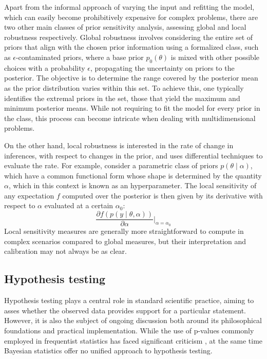 Apart from the informal approach of varying the input and refitting the model, which can easily become prohibitively expensive for complex problems, there are two other main classes of prior sensitivity analysis, assessing global and local robustness respectively. 
Global robustness involves considering the entire set of priors that align with the chosen prior information using a formalized class, such as $\epsilon$-contaminated priors, where a base prior $p_0(\theta)$ is mixed with other possible choices with a probability $\epsilon$, propagating the uncertainty on priors to the posterior. The objective is to determine the range covered by the posterior mean as the prior distribution varies within this set. To achieve this, one typically identifies the extremal priors in the set, those that yield the maximum and minimum posterior means. While not requiring to fit the model for every prior in the class, this process can become intricate when dealing with multidimensional problems.

On the other hand, local robustness is interested in the rate of change in inferences, with respect to changes in the prior, and uses differential techniques to evaluate the rate. 
For example, consider a parametric class of priors $p(\theta\mid\alpha)$, which have a common functional form whose shape is determined by the quantity $\alpha$, which in this context is known as an hyperparameter. 
The local sensitivity of any expectation $f$ computed over the posterior is then given by its derivative with respect to $\alpha$ evaluated at a certain $\alpha_0$:
\begin{equation}
    \frac{\partial f(p(y\mid \theta,\alpha))}{\partial\alpha}\rvert_{\alpha=\alpha_0}
\end{equation}
Local sensitivity measures are generally more straightforward to compute in complex scenarios compared to global measures, but their interpretation and calibration may not always be as clear. 


\subsection{Hypothesis testing}
Hypothesis testing plays a central role in standard scientific practice, aiming to asses whether the observed data
provides support for a particular statement. However, it is also the subject of ongoing discussion both around its
philosophical foundations and practical implementation. While the use of p-values commonly employed in frequentist
statistics has faced significant criticism \cite{wasserstein2016asa}, at the same time Bayesian statistics offer no unified approach to hypothesis testing. 

